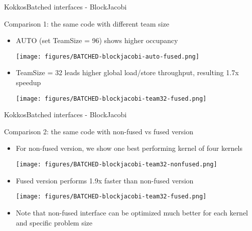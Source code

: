 \begin{frame}[fragile]{KokkosBatched interfaces - BlockJacobi}

  Comparison 1: the same code with different team size
  \begin{itemize}
  \item \footnotesize{AUTO (set TeamSize = 96) shows higher occupancy}
    \begin{center}
      \texttt{[image: figures/BATCHED-blockjacobi-auto-fused.png]}
    \end{center}
  \item \footnotesize{TeamSize = 32 leads higher global load/store throughput, resulting 1.7x speedup }
    \begin{center}
      \texttt{[image: figures/BATCHED-blockjacobi-team32-fused.png]}
    \end{center}
  \end{itemize}

\end{frame}

\begin{frame}[fragile]{KokkosBatched interfaces - BlockJacobi}

  Comparison 2: the same code with non-fused vs fused version
  \begin{itemize}
  \item \footnotesize{For non-fused version, we show one best performing kernel of four kernels}
    \begin{center}
      \texttt{[image: figures/BATCHED-blockjacobi-team32-nonfused.png]}
    \end{center}
  \item \footnotesize{Fused version performs 1.9x faster than non-fused version}
    \begin{center}
      \texttt{[image: figures/BATCHED-blockjacobi-team32-fused.png]}
    \end{center}
  \item \footnotesize{Note that non-fused interface can be optimized much better for each kernel and specific problem size}
  \end{itemize}

\end{frame}

